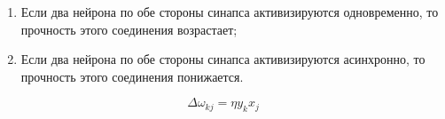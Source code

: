 \begin{enumerate}
    \item Если два нейрона по обе стороны синапса активизируются одновременно, то прочность этого соединения возрастает;
    \item Если два нейрона по обе стороны синапса активизируются асинхронно, то прочность этого соединения понижается.
\end{enumerate}

\begin{equation*}
    \Delta \omega_{kj} = \eta y_kx_j
\end{equation*}
